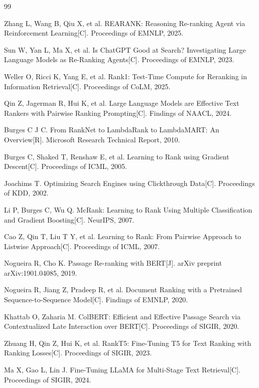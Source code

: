 \documentclass[12pt,a4paper]{article}
\begin{document}
\begin{thebibliography}{99}

 Zhang L, Wang B, Qiu X, et al. REARANK: Reasoning Re-ranking Agent via Reinforcement Learning[C]. Proceedings of EMNLP, 2025.

 Sun W, Yan L, Ma X, et al. Is ChatGPT Good at Search? Investigating Large Language Models as Re-Ranking Agents[C]. Proceedings of EMNLP, 2023.

 Weller O, Ricci K, Yang E, et al. Rank1: Test-Time Compute for Reranking in Information Retrieval[C]. Proceedings of CoLM, 2025.

 Qin Z, Jagerman R, Hui K, et al. Large Language Models are Effective Text Rankers with Pairwise Ranking Prompting[C]. Findings of NAACL, 2024.

 Burges C J C. From RankNet to LambdaRank to LambdaMART: An Overview[R]. Microsoft Research Technical Report, 2010.

 Burges C, Shaked T, Renshaw E, et al. Learning to Rank using Gradient Descent[C]. Proceedings of ICML, 2005.

 Joachims T. Optimizing Search Engines using Clickthrough Data[C]. Proceedings of KDD, 2002.

 Li P, Burges C, Wu Q. McRank: Learning to Rank Using Multiple Classification and Gradient Boosting[C]. NeurIPS, 2007.

 Cao Z, Qin T, Liu T Y, et al. Learning to Rank: From Pairwise Approach to Listwise Approach[C]. Proceedings of ICML, 2007.

 Nogueira R, Cho K. Passage Re-ranking with BERT[J]. arXiv preprint arXiv:1901.04085, 2019.

 Nogueira R, Jiang Z, Pradeep R, et al. Document Ranking with a Pretrained Sequence-to-Sequence Model[C]. Findings of EMNLP, 2020.

 Khattab O, Zaharia M. ColBERT: Efficient and Effective Passage Search via Contextualized Late Interaction over BERT[C]. Proceedings of SIGIR, 2020.

 Zhuang H, Qin Z, Hui K, et al. RankT5: Fine-Tuning T5 for Text Ranking with Ranking Losses[C]. Proceedings of SIGIR, 2023.

 Ma X, Gao L, Lin J. Fine-Tuning LLaMA for Multi-Stage Text Retrieval[C]. Proceedings of SIGIR, 2024.


\end{thebibliography}
\end{document}
